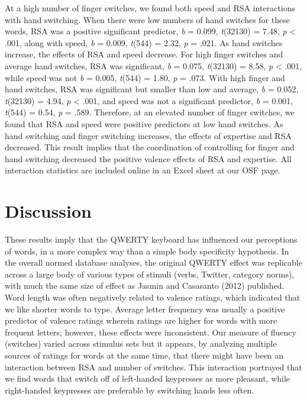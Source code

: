\documentclass[english,man]{apa6}
\theoremstyle{definition}
\theoremstyle{definition}
\theoremstyle{definition}
\theoremstyle{remark}
\begin{document}
At a high number of finger switches, we found both speed and RSA
interactions with hand switching. When there were low numbers of hand
switches for these words, RSA was a positive significant predictor,
\emph{b} = 0.099, \emph{t}(32130) = 7.48, \emph{p} \textless{} .001,
along with speed, \emph{b} = 0.009, \emph{t}(544) = 2.32, \emph{p} =
.021. As hand switches increase, the effects of RSA and speed decrease.
For high finger switches and average hand switches, RSA was significant,
\emph{b} = 0.075, \emph{t}(32130) = 8.58, \emph{p} \textless{} .001,
while speed was not \emph{b} = 0.005, \emph{t}(544) = 1.80, \emph{p} =
.073. With high finger and hand switches, RSA was significant but
smaller than low and average, \emph{b} = 0.052, \emph{t}(32130) = 4.94,
\emph{p} \textless{} .001, and speed was not a significant predictor,
\emph{b} = 0.001, \emph{t}(544) = 0.54, \emph{p} = .589. Therefore, at
an elevated number of finger switches, we found that RSA and speed were
positive predictors at low hand switches. As hand switching and finger
switching increases, the effects of expertise and RSA decreased. This
result implies that the coordination of controlling for finger and hand
switching decreased the positive valence effects of RSA and expertise.
All interaction statistics are included online in an Excel sheet at our
OSF page.

\section{Discussion}\label{discussion}

These results imply that the QWERTY keyboard has influenced our
perceptions of words, in a more complex way than a simple body
specificity hypothesis. In the overall normed database analyses, the
original QWERTY effect was replicable across a large body of various
types of stimuli (verbs, Twitter, category norms), with much the same
size of effect as Jasmin and Casasanto (2012) published. Word length was
often negatively related to valence ratings, which indicated that we
like shorter words to type. Average letter frequency was usually a
positive predictor of valence ratings wherein ratings are higher for
words with more frequent letters; however, these effects were
inconsistent. Our measure of fluency (switches) varied across stimulus
sets but it appears, by analyzing multiple sources of ratings for words
at the same time, that there might have been an interaction between RSA
and number of switches. This interaction portrayed that we find words
that switch off of left-handed keypresses as more pleasant, while
right-handed keypresses are preferable by switching hands less often.
\end{document}
